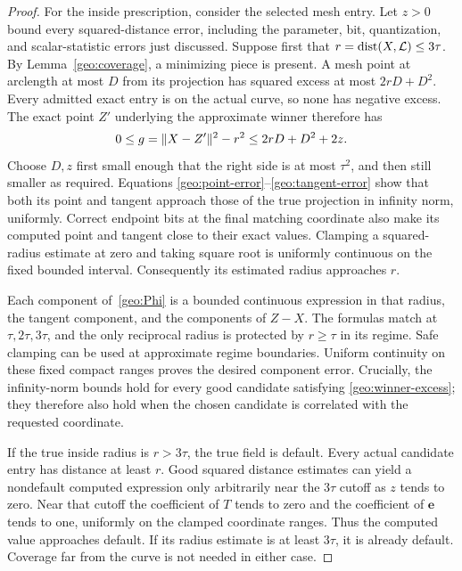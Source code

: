 \begin{proof}
For the inside prescription, consider the selected mesh entry.
Let $z>0$ bound every squared-distance error, including the parameter,
bit, quantization, and scalar-statistic errors just discussed. Suppose
first that $r=\operatorname{dist}(X,\mathcal L)\le3\tau$. By
Lemma~\ref{geo:coverage}, a minimizing piece is present. A mesh point
at arclength at most $D$ from its projection has squared excess at most
$2rD+D^2$. Every admitted exact entry is on the actual curve, so none
has negative excess. The exact point $Z'$ underlying the approximate
winner therefore has
\begin{equation}\label{geo:winner-excess}
 0\le g=\lVert X-Z'\rVert^2-r^2\le2rD+D^2+2z.
\end{equation}
Choose $D,z$ first small enough that the right side is at most
$\tau^2$, and then still smaller as required. Equations
\eqref{geo:point-error}--\eqref{geo:tangent-error} show that both its
point and tangent approach those of the true projection in infinity
norm, uniformly. Correct endpoint bits at the final matching coordinate
also make its computed point and tangent close to their exact values.
Clamping a squared-radius estimate at zero and taking square root is
uniformly continuous on the fixed bounded interval. Consequently its
estimated radius approaches $r$.

Each component of~\eqref{geo:Phi} is a bounded continuous expression
in that radius, the tangent component, and the components of $Z-X$.
The formulas match at $\tau,2\tau,3\tau$, and the only reciprocal
radius is protected by $r\ge\tau$ in its regime. Safe clamping can be
used at approximate regime boundaries. Uniform continuity on these
fixed compact ranges proves the desired component error. Crucially,
the infinity-norm bounds hold for every good candidate satisfying
\eqref{geo:winner-excess}; they therefore also hold when the chosen
candidate is correlated with the requested coordinate.

If the true inside radius is $r>3\tau$, the true field is default.
Every actual candidate entry has distance at least $r$. Good squared
distance estimates can yield a nondefault computed expression only
arbitrarily near the $3\tau$ cutoff as $z$ tends to zero. Near that
cutoff the coefficient of $T$ tends to zero and the coefficient of
$\mathbf e$ tends to one, uniformly on the clamped coordinate ranges.
Thus the computed value approaches default. If its radius estimate is
at least $3\tau$, it is already default. Coverage far from the curve
is not needed in either case.


\end{proof}
